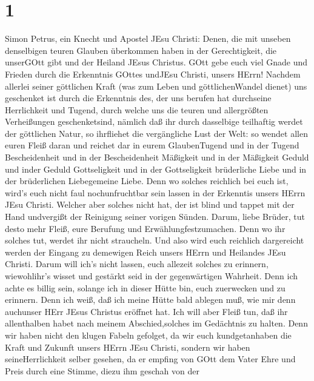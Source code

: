 \hypertarget{section}{%
\section{1}\label{section}}

 Simon Petrus, ein Knecht und Apostel JEsu Christi: Denen,
die mit unseben denselbigen teuren Glauben überkommen haben in der
Gerechtigkeit, die unserGOtt gibt und der Heiland JEsus Christus.
 GOtt gebe euch viel Gnade und Frieden durch die Erkenntnis
GOttes undJEsu Christi, unsers HErrn!  Nachdem allerlei
seiner göttlichen Kraft (was zum Leben und göttlichenWandel dienet) uns
geschenket ist durch die Erkenntnis des, der uns berufen hat durchseine
Herrlichkeit und Tugend,  durch welche uns die teuren und
allergrößten Verheißungen geschenketsind, nämlich daß ihr durch
dasselbige teilhaftig werdet der göttlichen Natur, so ihrfliehet die
vergängliche Lust der Welt:  so wendet allen euren Fleiß
daran und reichet dar in eurem GlaubenTugend und in der Tugend
Bescheidenheit  und in der Bescheidenheit Mäßigkeit und in
der Mäßigkeit Geduld und inder Geduld Gottseligkeit  und in
der Gottseligkeit brüderliche Liebe und in der brüderlichen Liebegemeine
Liebe.  Denn wo solches reichlich bei euch ist, wird's euch
nicht faul nochunfruchtbar sein lassen in der Erkenntis unsers HErrn
JEsu Christi.  Welcher aber solches nicht hat, der ist blind
und tappet mit der Hand undvergißt der Reinigung seiner vorigen Sünden.
 Darum, liebe Brüder, tut desto mehr Fleiß, eure Berufung
und Erwählungfestzumachen. Denn wo ihr solches tut, werdet ihr nicht
straucheln.  Und also wird euch reichlich dargereicht
werden der Eingang zu demewigen Reich unsers HErrn und Heilandes JEsu
Christi.  Darum will ich's nicht lassen, euch allezeit
solches zu erinnern, wiewohlihr's wisset und gestärkt seid in der
gegenwärtigen Wahrheit.  Denn ich achte es billig sein,
solange ich in dieser Hütte bin, euch zuerwecken und zu erinnern.
 Denn ich weiß, daß ich meine Hütte bald ablegen muß, wie
mir denn auchunser HErr JEsus Christus eröffnet hat.  Ich
will aber Fleiß tun, daß ihr allenthalben habet nach meinem
Abschied,solches im Gedächtnis zu halten.  Denn wir haben
nicht den klugen Fabeln gefolget, da wir euch kundgetanhaben die Kraft
und Zukunft unsers HErrn JEsu Christi, sondern wir haben
seineHerrlichkeit selber gesehen,  da er empfing von GOtt
dem Vater Ehre und Preis durch eine Stimme, diezu ihm geschah von der
